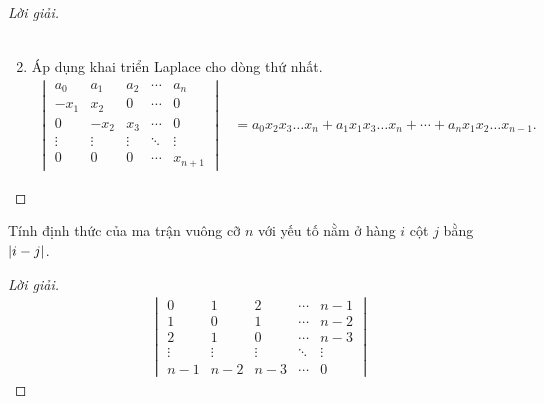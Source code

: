 \documentclass[class=linearalgebra,crop=false]{standalone}
\begin{document}
\begin{proof}[Lời giải]
\begin{enumerate}[label = (\alph*)]
\begin{align*}
            \end{align*}
            \endgroup
        \item Áp dụng khai triển Laplace cho dòng thứ nhất.
            \begingroup
            \allowdisplaybreaks{}
            \begin{align*}
                \begin{vmatrix}
                    a_{0}  & a_{1}  & a_{2}  & \cdots & a_{n}  \\
                    -x_{1} & x_{2}  & 0      & \cdots & 0      \\
                    0      & -x_{2} & x_{3}  & \cdots & 0      \\
                    \vdots & \vdots & \vdots & \ddots & \vdots \\
                    0      & 0      & 0      & \cdots & x_{n+1}
                \end{vmatrix}
                & = a_{0}x_{2}x_{3}\ldots x_{n} + a_{1}x_{1}x_{3}\ldots x_{n} + \cdots + a_{n}x_{1}x_{2}\ldots x_{n-1}.
            \end{align*}
            \endgroup
    \end{enumerate}
\end{proof}

\begin{exercise}
    Tính định thức của ma trận vuông cỡ $n$ với yếu tố nằm ở hàng $i$ cột $j$ bằng $\left|{i - j}\right|$.
\end{exercise}

\begin{proof}[Lời giải]
    \begingroup
    \allowdisplaybreaks{}
    \begin{align*}
        \begin{vmatrix}
            0 & 1 & 2 & \cdots & n - 1 \\
            1 & 0 & 1 & \cdots & n - 2 \\
            2 & 1 & 0 & \cdots & n - 3 \\
            \vdots & \vdots & \vdots & \ddots & \vdots \\
            n - 1 & n - 2 & n - 3 & \cdots & 0
        \end{vmatrix}
    \end{align*}
    \endgroup
\end{proof}
\end{document}
